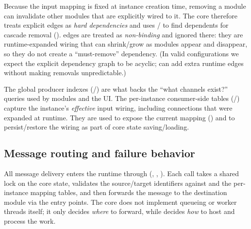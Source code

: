 Because the input mapping is fixed at instance creation time, removing a module can invalidate other modules that are explicitly wired to it.
The core therefore treats explicit edges as \emph{hard dependencies} and uses / to find dependents for cascade removal ().
 edges are treated as \emph{non-binding} and ignored there: they are runtime-expanded wiring that can shrink/grow as modules appear and disappear, so they do not create a ``must-remove'' dependency.
(In valid configurations we expect the explicit dependency graph to be acyclic;  can add extra runtime edges without making removals unpredictable.)


The global producer indexes (/) are what backs the ``what channels exist?'' queries used by modules and the UI.
The per-instance consumer-side tables (/) capture the instance's \emph{effective} input wiring, including  connections that were expanded at runtime.
They are used to expose the current mapping () and to persist/restore the wiring as part of core state saving/loading.


\subsection{Message routing and failure behavior} \label{subsec:ch3_core_routing}

All message delivery enters the runtime through  (, , ).
Each call takes a shared lock on the core state, validates the source/target identifiers against  and the per-instance mapping tables, and then forwards the message to the destination module via the  entry points.
The core does not implement queueing or worker threads itself; it only decides \emph{where} to forward, while  decides \emph{how} to host and process the work.

